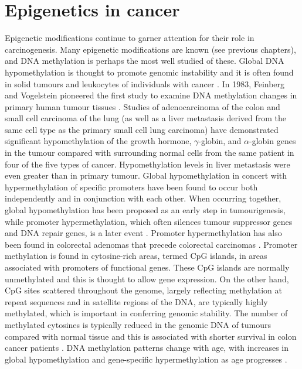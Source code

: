 \section{Epigenetics in cancer} %
\noindent Epigenetic modifications continue to garner attention for their role in carcinogenesis. Many epigenetic modifications are known (see previous chapters), and DNA methylation is perhaps the most well studied of these. Global DNA hypomethylation is thought to promote genomic instability and it is often found in solid tumours \cite{c215} and leukocytes of individuals with cancer \cite{c216,c217}. In 1983, Feinberg and Vogelstein pioneered the first study to examine DNA methylation changes in primary human tumour tissues \cite{c215}. Studies of adenocarcinoma of the colon and small cell carcinoma of the lung (as well as a liver metastasis derived from the same cell type as the primary small cell lung carcinoma) have demonstrated significant hypomethylation of the growth hormone, $\gamma$-globin, and $\alpha$-globin genes in the tumour compared with surrounding normal cells from the same patient in four of the five types of cancer. Hypomethylation levels in liver metastasis were even greater than in 
primary tumour. Global hypomethylation in concert with hypermethylation of specific promoters have been found to occur both independently and in conjunction with each other. When occurring together, global hypomethylation has been proposed as an early step in tumourigenesis, while promoter hypermethylation, which often silences tumour suppressor genes and DNA repair genes, is a later event \cite{c218}. Promoter hypermethylation has also been found in colorectal adenomas that precede colorectal carcinomas \cite{c219}. Promoter methylation is found in cytosine-rich areas, termed CpG islands, in areas associated with promoters of functional genes. These CpG islands are normally unmethylated and this is thought to allow gene expression. On the other hand, CpG sites scattered throughout the genome, largely reflecting methylation at repeat sequences and in satellite regions of the DNA, are typically highly methylated, which is important in conferring genomic stability. The number of methylated cytosines is 
typically reduced in the genomic DNA of tumours compared with normal tissue \cite{c220} and this is associated with shorter survival in colon cancer patients \cite{c221}. DNA methylation patterns change with age, with increases in global hypomethylation and gene-specific hypermethylation as age progresses \cite{c222,c223}. 
 

